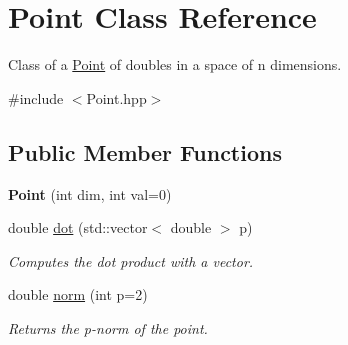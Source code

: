 \hypertarget{class_point}{}\section{Point Class Reference}
\label{class_point}


Class of a \hyperlink{class_point}{Point} of doubles in a space of n dimensions.  




{\ttfamily \#include $<$Point.\+hpp$>$}

\subsection*{Public Member Functions}
\begin{DoxyCompactItemize}
\item 
\mbox{\label{class_point_aa2847c6f3245886323975a5087f5c1f5}} 
{\bfseries Point} (int dim, int val=0)
\item 
double \hyperlink{class_point_a9d8da6733d7e4110a62e8d0f82676761}{dot} (std\+::vector$<$ double $>$ p)
\begin{DoxyCompactList}\small\item\em Computes the dot product with a vector. \end{DoxyCompactList}\item 
double \hyperlink{class_point_aab64e3f0a9eecba00a1607eb4c7768c3}{norm} (int p=2)
\begin{DoxyCompactList}\small\item\em Returns the p-\/norm of the point. \end{DoxyCompactList}\end{DoxyCompactItemize}
